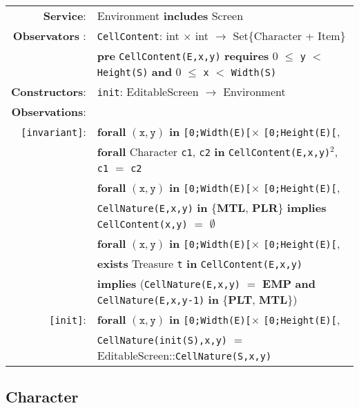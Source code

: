 \documentclass[8pt]{article}
\begin{document}
{\small
\begin{tabular}{rl}
  \textbf{Service}: & Environment \textbf{includes} Screen
  \\ \textbf{Observators} : & \texttt{CellContent}:
  \textrm{int} $\times$ \textrm{int} $\rightarrow$
  \textrm{Set\{Character + Item\}} \\
  & \quad \textbf{pre } \texttt{CellContent(E,x,y)} \textbf{ requires } 0 $\leq$ \texttt{y} $<$ \texttt{Height(S)} \textbf{ and } 0 $\leq$ \texttt{x} $<$ \texttt{Width(S)}\\
  \textbf{Constructors}: & \texttt{init}: \textrm{EditableScreen} $\rightarrow$ \textrm{Environment} \\
  \textbf{Observations}: \\
  \texttt{[invariant]}: & \textbf{forall} $(\mathtt{x},\mathtt{y})$ \textbf{in} \texttt{[0;Width(E)[}$\times$ \texttt{[0;Height(E)[},~\\ & \quad\quad \textbf{forall} \textrm{Character} \texttt{c1}, \texttt{c2} \textbf{in} \texttt{CellContent(E,x,y)}$^2$, \texttt{c1} $=$ \texttt{c2} \\
          & \textbf{forall} $(\mathtt{x},\mathtt{y})$ \textbf{in} \texttt{[0;Width(E)[}$\times$ \texttt{[0;Height(E)[},~\\ & \quad\quad \texttt{CellNature(E,x,y)} \textbf{in} \{\textbf{MTL}, \textbf{PLR}\} \textbf{implies} \texttt{CellContent(x,y)} $=$ $\emptyset$  \\
                  & \textbf{forall} $(\mathtt{x},\mathtt{y})$ \textbf{in} \texttt{[0;Width(E)[}$\times$ \texttt{[0;Height(E)[},~\\ & \quad\quad \textbf{exists} \textrm{Treasure} \texttt{t} \textbf{in} \texttt{CellContent(E,x,y)}  \\ & \quad\quad \textbf{implies} (\texttt{CellNature(E,x,y)} $=$ \textbf{EMP} \textbf{and} \texttt{CellNature(E,x,y-1)} \textbf{in} \{\textbf{PLT}, \textbf{MTL}\})\\
                          \texttt{[init]}: & \textbf{forall} $(\mathtt{x},\mathtt{y})$ \textbf{in} \texttt{[0;Width(E)[}$\times$ \texttt{[0;Height(E)[},~\\ & \quad\quad
                                  \texttt{CellNature(init(S),x,y)} $=$ \textrm{EditableScreen}::\texttt{CellNature(S,x,y)} \\
\end{tabular}}

\subsection{Character}
\end{document}
